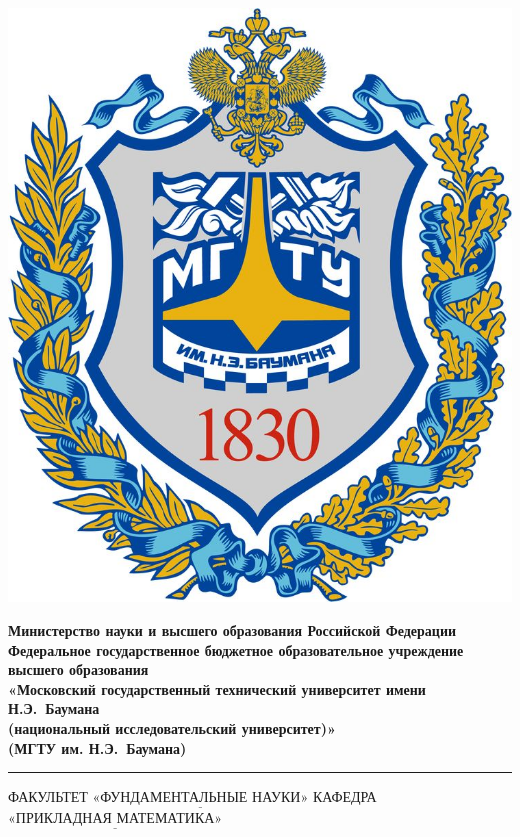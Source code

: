 \documentclass[14pt]{article}
\begin{document}
	
	\thispagestyle{empty}
	
	\noindent \begin{minipage}{0.15\textwidth}
		\includegraphics[width=\linewidth]{1}
	\end{minipage}
	\noindent\begin{minipage}{0.85\textwidth}\centering
		\textbf{Министерство науки и высшего образования Российской Федерации}\\
		\textbf{Федеральное государственное бюджетное образовательное учреждение высшего образования}\\
		\textbf{«Московский государственный технический университет имени Н.Э.~Баумана}\\
		\textbf{(национальный исследовательский университет)»}\\
		\textbf{(МГТУ им. Н.Э.~Баумана)}
	\end{minipage}
	
	\noindent\rule{\linewidth}{3pt}
	\newline\newline
	\noindent ФАКУЛЬТЕТ $\underline{\text{«ФУНДАМЕНТАЛЬНЫЕ НАУКИ»}}$ \newline\newline
	\noindent КАФЕДРА $\underline{\text{«ПРИКЛАДНАЯ МАТЕМАТИКА»}}$
	
\end{document}
